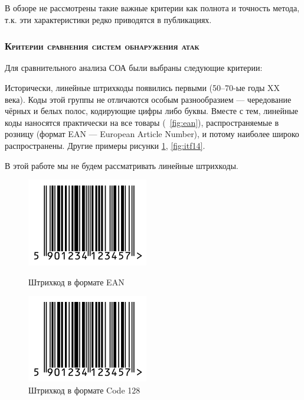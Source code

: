 В обзоре не рассмотрены такие важные критерии как полнота и точность метода, т.к. эти характеристики редко приводятся в публикациях.

\subsubsection{\textsc{Критерии сравнения систем обнаружения атак}}

Для сравнительного анализа СОА были выбраны следующие критерии:


Исторически, линейные штрихкоды появились первыми (50--70-ые годы 
XX века). Коды этой группы не отличаются особым разнообразием ---
чередование чёрных и белых полос, кодирующие цифры либо буквы. Вместе
с тем, линейные коды наносятся практически на все товары 
(\figurename\ \ref{fig:ean}), 
распространяемые в розницу (формат EAN --- European Article Number),
и потому наиболее широко распространены. Другие примеры рисунки 
\ref{fig:code128}, \ref{fig:itf14}. 

В этой работе мы не будем рассматривать линейные штрихкоды.

\begin{figure}[h]
    \begin{multicols}{2}
 
        \begin{center}
             \includegraphics[scale=0.5]{img/ean_sample} 
             \caption{Штрихкод в формате EAN}
             \label{fig:ean}
        \end{center}
   
        \begin{center}
            \includegraphics[scale=0.5]{img/ean_sample} 
            \caption{Штрихкод в формате Code 128}
            \label{fig:code128}
        \end{center}       
       
    \end{multicols}
\end{figure}

